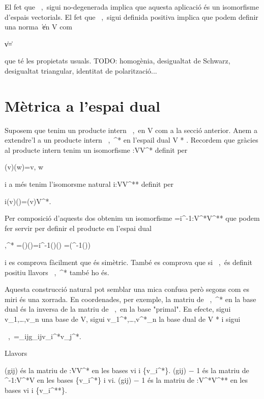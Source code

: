 El fet que \left\langle\ ,\ \right\rangle sigui no-degenerada implica que aquesta aplicació és un isomorfisme d'espais vectorials. El fet que \left\langle\ ,\ \right\rangle sigui definida positiva implica que podem definir una norma \|\ \| en V com

    \|v\|= 

que té les propietats usuals. TODO: homogènia, desigualtat de Schwarz, desigualtat triangular, identitat de polarització...

\section{Mètrica a l'espai dual}

Suposem que tenim un producte intern \left\langle\ ,\ \right\rangle en V com a la secció anterior. Anem a extendre'l a un producte intern \left\langle\ ,\ \right\rangle^* en l'espail dual V * . Recordem que gràcies al producte intern tenim un isomorfisme \alpha:V\to V^* definit per

    \alpha(v)(w)=\left\langle v, w\right\rangle 

i a més tenim l'isomorsme natural i:V\to V^{**} definit per

    i(v)(\lambda)=\lambda(v)\qquad\forall\lambda\in V^*. 

Per composició d'aquests dos obtenim un isomorfisme \beta=i\circ\alpha^{-1}:V^*\to V^{**} que podem fer servir per definir el producte en l'espai dual

    \left\langle\lambda,\mu\right\rangle^* =\beta(\lambda)(\mu)=i\alpha^{-1}(\lambda)(\mu) =\mu(\alpha^{-1}(\lambda)) 

i es comprova fàcilment que és simètric. També es comprova que si \left\langle\ ,\ \right\rangle és definit positiu llavors \left\langle\ ,\ \right\rangle^* també ho és.

Aquesta construcció natural pot semblar una mica confusa però segons com es miri és una xorrada. En coordenades, per exemple, la matriu de \left\langle\ ,\ \right\rangle^* en la base dual és la inversa de la matriu de \left\langle\ ,\ \right\rangle en la base "primal". En efecte, sigui v_1,\dots,v_n una base de V, sigui v_1^*,\dots,v^*_n la base dual de V * i sigui

    \left\langle\ ,\ \right\rangle=\sum_{ij}g_{ij}v_i^*\otimes v_j^*. 

Llavors

    (gij) és la matriu de \alpha:V\to V^* en les bases {vi} i \{v_i^*\}. 
    (gij) − 1 és la matriu de \alpha^{-1}:V^*\to V en les bases \{v_i^*\} i {vi}. 
    (gij) − 1 és la matriu de \beta:V^*\to V^{**} en les bases {vi} i \{v_i^{**}\}. 

